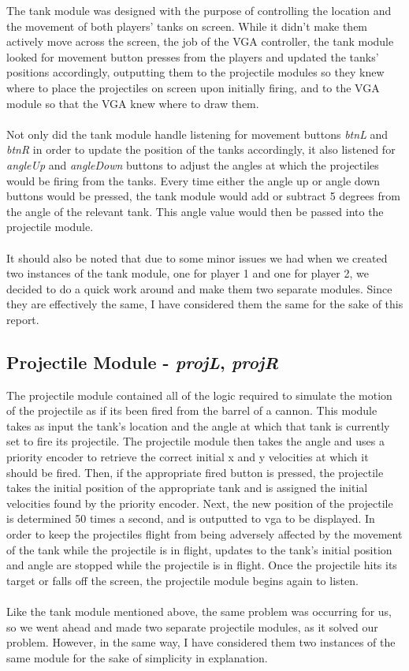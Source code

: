 \documentclass{article}
\begin{document}
The tank module was designed with the purpose of controlling the location and the movement of both players' tanks on screen.  While it didn't make them actively move across the screen, the job of the VGA controller, the tank module looked for movement button presses from the players and updated the tanks' positions accordingly, outputting them to the projectile modules so they knew where to place the projectiles on screen upon initially firing, and to the VGA module so that the VGA knew where to draw them.  
\\
\\
Not only did the tank module handle listening for movement buttons \textit{btnL} and \textit{btnR} in order to update the position of the tanks accordingly, it also listened for \textit{angleUp} and \textit{angleDown} buttons to adjust the angles at which the projectiles would be firing from the tanks.  Every time either the angle up or angle down buttons would be pressed, the tank module would add or subtract 5 degrees from the angle of the relevant tank.  This angle value would then be passed into the projectile module.
\\
\\
It should also be noted that due to some minor issues we had when we created two instances of the tank module, one for player 1 and one for player 2, we decided to do a quick work around and make them two separate modules.  Since they are effectively the same, I have considered them the same for the sake of this report.

\subsection*{Projectile Module - \textit{projL}, \textit{projR}}

The projectile module contained all of the logic required to simulate the motion of the projectile as if its been fired from the barrel of a cannon.  This module takes as input the tank's location and the angle at which that tank is currently set to fire its projectile.  The projectile module then takes the angle and uses a priority encoder to retrieve the correct initial x and y velocities at which it should be fired.  Then, if the appropriate fired button is pressed, the projectile takes the initial position of the appropriate tank and is assigned the initial velocities found by the priority encoder.  Next, the new position of the projectile is determined 50 times a second, and is outputted to vga to be displayed.  In order to keep the projectiles flight from being adversely affected by the movement of the tank while the projectile is in flight, updates to the tank's initial position and angle are stopped while the projectile is in flight. Once the projectile hits its target or falls off the screen, the projectile module begins again to listen.
\\
\\
Like the tank module mentioned above, the same problem was occurring for us, so we went ahead and made two separate projectile modules, as it solved our problem.  However, in the same way, I have considered them two instances of the same module for the sake of simplicity in explanation.
\end{document}
